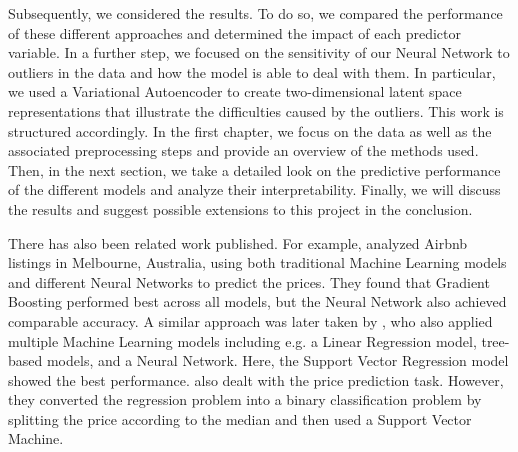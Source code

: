 Subsequently, we considered the results.
To do so, we compared the performance of these different approaches and determined the impact of each predictor variable.
In a further step, we focused on the sensitivity of our Neural Network to outliers in the data and how the model is able to deal with them.
In particular, we used a Variational Autoencoder to create two-dimensional latent space representations that illustrate the difficulties caused by the outliers.
This work is structured accordingly.
In the first chapter, we focus on the data as well as the associated preprocessing steps and provide an overview of the methods used.
Then, in the next section, we take a detailed look on the predictive performance of the different models and analyze their interpretability.
Finally, we will discuss the results and suggest possible extensions to this project in the conclusion.

There has also been related work published. For example, \citet{cai2019} analyzed Airbnb listings in Melbourne, Australia, using both traditional Machine Learning models and different Neural Networks to predict the prices. They found that Gradient Boosting performed best across all models, but the Neural Network also achieved comparable accuracy.
A similar approach was later taken by \citet{rezazadeh2021}, who also applied multiple Machine Learning models including e.g. a Linear Regression model, tree-based models, and a Neural Network. Here, the Support Vector Regression model showed the best performance.
\citet{tang2015} also dealt with the price prediction task. However, they converted the regression problem into a binary classification problem by splitting the price according to the median and then used a Support Vector Machine.
